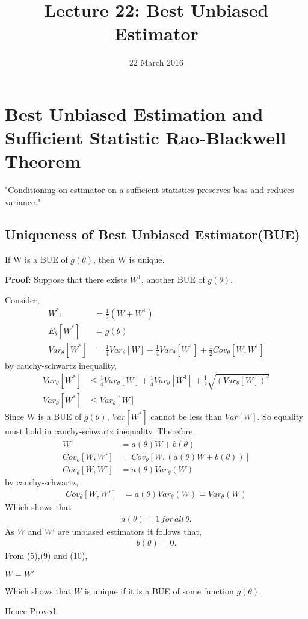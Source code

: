 \documentclass[12pt,a4paper]{article}
\begin{document}
\title{Lecture 22: Best Unbiased Estimator}
\date{22 March 2016}
\author{}
\maketitle
\section{Best Unbiased Estimation and Sufficient Statistic Rao-Blackwell Theorem}
"Conditioning on estimator on a sufficient statistics preserves bias and reduces variance."
\subsection{Uniqueness of Best Unbiased Estimator(BUE)}
\begin{thm} 
If W is a BUE of $g(\theta)$, then W is unique.
\end{thm}
\begin{flushleft}
\textbf{Proof:} Suppose that there exists $W^1$, another BUE of $g(\theta)$.
\end{flushleft}
Consider, 
\begin{align}
W^*:&=\frac{1}{2}(W+W^1)\\
E_\theta[W^*] &= g(\theta)\\
Var_\theta[W^*] &= \frac{1}{4}Var_\theta[W]+\frac{1}{4}Var_\theta[W^1]+\frac{1}{2}Cov_\theta[W,W^1]
\end{align}
by cauchy-schwartz inequality,
\begin{align}
\nonumber
Var_\theta[W^*]&\leq\frac{1}{4}Var_\theta[W]+\frac{1}{4}Var_\theta[W^1]+\frac{1}{2}\sqrt{(Var_\theta[W])^2}\\
Var_\theta[W^*]&\leq Var_\theta[W]
\end{align}
Since W is a BUE of $g(\theta)$, $Var[W^*]$ cannot be less than $Var[W]$.
So equality must hold in  cauchy-schwartz inequality. Therefore,\\
\begin{align}
W^1&=a(\theta) W + b(\theta)\\
Cov_\theta[W,W']&=Cov_\theta[W,(a(\theta)W+b(\theta))]\\
Cov_\theta[W,W']&=a(\theta)Var_\theta(W)
\end{align}
by cauchy-schwartz,
\begin{align}
Cov_\theta[W,W']&=a(\theta)Var_\theta(W)=Var_\theta(W)
\end{align}
Which shows that 
\begin{align}
a(\theta)=1\, for \,all \,\theta.
\end{align}
As $W$ and $W'$ are unbiased estimators it follows that,
\begin{align}
b(\theta)=0. 
\end{align}
From (5),(9) and (10),\\
\begin{center}
$W=W'$
\end{center}
Which shows that $W$ is unique if it is a BUE of some function $g(\theta).$
\begin{center}
Hence Proved.
\end{center}
\end{document}

